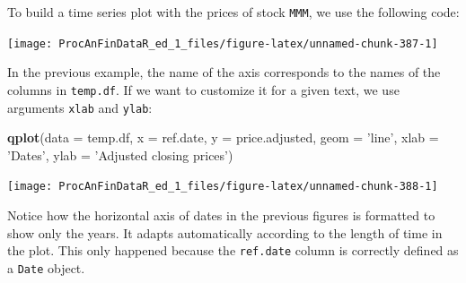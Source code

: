 \documentclass[11pt,]{book}
\newenvironment{Shaded}{\begin{snugshade}}{\end{snugshade}}
\newcommand{\KeywordTok}[1]{\textcolor[rgb]{0.27,0.27,0.27}{\textbf{#1}}}
\newcommand{\DataTypeTok}[1]{\textcolor[rgb]{0.27,0.27,0.27}{#1}}
\newcommand{\StringTok}[1]{\textcolor[rgb]{0.5,0.5,0.5}{#1}}
\newcommand{\CommentTok}[1]{\textcolor[rgb]{0.56,0.35,0.01}{\textit{#1}}}
\newcommand{\OperatorTok}[1]{\textcolor[rgb]{0.81,0.36,0.00}{\textbf{#1}}}
\newcommand{\NormalTok}[1]{#1}
\begin{document}
To build a time series plot with the prices of stock \texttt{MMM}, we
use the following code:

\begin{Shaded}
\end{Shaded}

\begin{center}\texttt{[image: ProcAnFinDataR\_ed\_1\_files/figure-latex/unnamed-chunk-387-1]} \end{center}

In the previous example, the name of the axis corresponds to the names
of the columns in \texttt{temp.df}. If we want to customize it for a
given text, we use arguments \texttt{xlab} and \texttt{ylab}:

\begin{Shaded}
\begin{Highlighting}[]
\KeywordTok{qplot}\NormalTok{(}\DataTypeTok{data =}\NormalTok{ temp.df, }
      \DataTypeTok{x =}\NormalTok{ ref.date, }
      \DataTypeTok{y =}\NormalTok{ price.adjusted, }
      \DataTypeTok{geom =} \StringTok{'line'}\NormalTok{, }
      \DataTypeTok{xlab =} \StringTok{'Dates'}\NormalTok{, }
      \DataTypeTok{ylab =} \StringTok{'Adjusted closing prices'}\NormalTok{)}
\end{Highlighting}
\end{Shaded}

\begin{center}\texttt{[image: ProcAnFinDataR\_ed\_1\_files/figure-latex/unnamed-chunk-388-1]} \end{center}

Notice how the horizontal axis of dates in the previous figures is
formatted to show only the years. It adapts automatically according to
the length of time in the plot. This only happened because the
\texttt{ref.date} column is correctly defined as a \texttt{Date} object.
\end{document}
